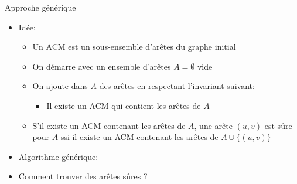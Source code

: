 \begin{frame}{Approche générique}


\begin{itemize}
\item Idée:
\begin{itemize}
\item Un ACM est un sous-ensemble d'arêtes du graphe initial
\item On démarre avec un ensemble d'arêtes $A=\emptyset$ vide
\item On ajoute dans $A$ des arêtes en respectant l'invariant suivant:
\begin{itemize}
\item Il existe un ACM qui contient les arêtes de $A$
\end{itemize}
\item S'il existe un ACM contenant les arêtes de $A$, une arête $(u,v)$
  est \alert{sûre} pour $A$ ssi il existe un ACM contenant les arêtes de $A\cup \{(u,v)\}$
\end{itemize}

\bigskip

\item Algorithme générique:

\begin{center}
{\small
{}
}
\end{center}

\item Comment trouver des arêtes sûres ?
\end{itemize}


\end{frame}

